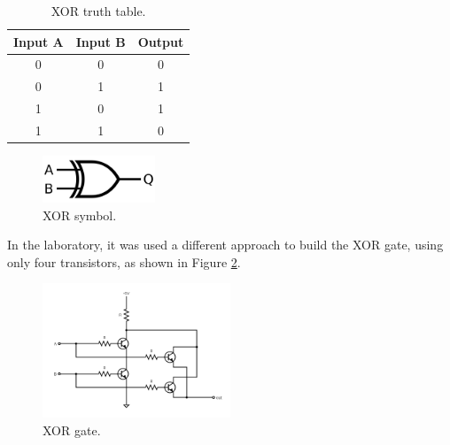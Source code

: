     \begin{table}[ht]
        \centering
        \begin{tabular}{|c|c|c|}
            \hline
            Input A & Input B & Output \\
            \hline
            0 & 0 & 0 \\
            0 & 1 & 1 \\
            1 & 0 & 1 \\
            1 & 1 & 0 \\
            \hline
        \end{tabular}
        \caption{XOR truth table.}
        \label{tab:XOR_table}
    \end{table}   
    
    \begin{figure}[H]
	    \centering
	    \includegraphics[width=0.3\textwidth]{figures/symbols/XOR.png}
	    \caption{XOR symbol.}
	    \label{fig:XOR_sym} 
	\end{figure}

    \noindent
    In the laboratory, it was used a different approach to build the XOR gate, using only four transistors, as shown in Figure \ref{fig:XOR_gate}.
    \begin{figure}[H]
        \centering
        \includegraphics[width=0.5\textwidth]{figures/circuits/XOR.png}
        \caption{XOR gate.}
        \label{fig:XOR_gate}
    \end{figure}

